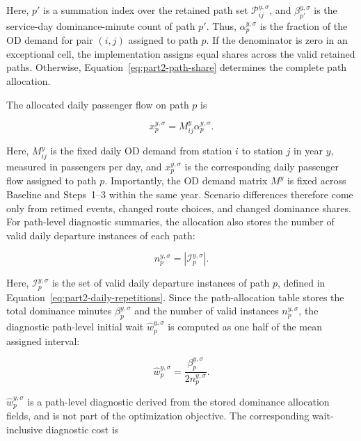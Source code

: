 \documentclass[preprint,12pt]{elsarticle}
\begin{document}
Here, \(p'\) is a summation index over the retained path set \(\mathcal{P}_{ij}^{y,\sigma}\), and \(\beta_{p'}^{y,\sigma}\) is the service-day dominance-minute count of path \(p'\). Thus, \(\alpha_p^{y,\sigma}\) is the fraction of the OD demand for pair \((i,j)\) assigned to path \(p\). If the denominator is zero in an exceptional cell, the implementation assigns equal shares across the valid retained paths. Otherwise, Equation~\eqref{eq:part2-path-share} determines the complete path allocation.

The allocated daily passenger flow on path \(p\) is

\begin{equation}
x_p^{y,\sigma}
=
M_{ij}^y\alpha_p^{y,\sigma}.
\label{eq:part2-path-demand}
\end{equation}

Here, \(M_{ij}^y\) is the fixed daily OD demand from station \(i\) to station \(j\) in year \(y\), measured in passengers per day, and \(x_p^{y,\sigma}\) is the corresponding daily passenger flow assigned to path \(p\). Importantly, the OD demand matrix \(M^y\) is fixed across Baseline and Steps~1--3 within the same year. Scenario differences therefore come only from retimed events, changed route choices, and changed dominance shares. For path-level diagnostic summaries, the allocation also stores the number of valid daily departure instances of each path:

\begin{equation}
n_p^{y,\sigma}
=
\left|\mathcal{I}_p^{y,\sigma}\right|.
\label{eq:part2-path-instance-count}
\end{equation}

Here, \(\mathcal{I}_p^{y,\sigma}\) is the set of valid daily departure instances of path \(p\), defined in Equation~\eqref{eq:part2-daily-repetitions}. Since the path-allocation table stores the total dominance minutes \(\beta_p^{y,\sigma}\) and the number of valid instances \(n_p^{y,\sigma}\), the diagnostic path-level initial wait \(\widehat w_p^{y,\sigma}\) is computed as one half of the mean assigned interval:

\begin{equation}
\widehat w_p^{y,\sigma}
=
\frac{\beta_p^{y,\sigma}}{2n_p^{y,\sigma}}.
\label{eq:part2-random-arrival-wait}
\end{equation}

\(\widehat w_p^{y,\sigma}\) is a path-level diagnostic derived from the stored dominance allocation fields, and is not part of the optimization objective. The corresponding wait-inclusive diagnostic cost is
\end{document}

